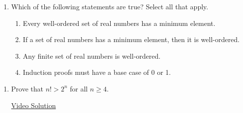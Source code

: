 \pagestyle{empty}


\begin{enumerate}
	\item Which of the following statements are true? Select all that apply.
	\begin{enumerate}
    \item Every well-ordered set of real numbers has a minimum element.
    \item If a set of real numbers has a minimum element, then it is well-ordered.
    \item Any finite set of real numbers is well-ordered.
    \item Induction proofs must have a base case of 0 or 1.
	\end{enumerate}


\end{enumerate}



\begin{enumerate}
	\item Prove that $n!>2^n$ for all $n \ge 4$.

	\href{https://youtu.be/xt3AgzI59LU}{Video Solution}


\end{enumerate}

